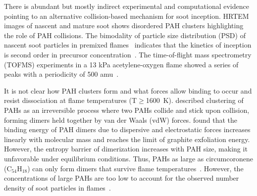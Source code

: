 
There is abundant but mostly indirect experimental and computational evidence pointing to an alternative collision-based mechanism for soot inception. HRTEM images of nascent and mature soot shows disordered PAH clusters highlighting the role of PAH collisions. The bimodality of particle size distribution (PSD) of nascent soot particles in premixed flames~\citep{zhao2003measurement} indicates that the kinetics of inception is second order in precursor concentration~\citep{abid2009quantitative}. The time-of-flight mass spectrometry (TOFMS) experiments in a 13 kPa acetylene-oxygen flame showed a series of peaks with a periodicity of 500 amu~\citep{happold2009soot}. 

It is not clear how PAH clusters form and what forces allow binding to occur and resist dissociation at flame temperatures (T$\ge$1600~K). \citet{frenklach2002reaction} described clustering of PAHs as an irreversible process where two PAHs collide and stick upon collision, forming dimers held together by van der Waals (vdW) forces. \citet{herdman2008intermolecular} found that the binding energy of PAH dimers due to dispersive and electrostatic forces increases linearly with molecular mass and reaches the limit of graphite exfoliation energy. However, the entropy barrier of dimerization increases with PAH size, making it unfavorable under equilibrium conditions. Thus, PAHs as large as circumcoronene (C$_{54}$H$_{18}$) can only form dimers that survive flame temperatures~\citep{Wang2011}. However, the concentrations of large PAHs are too low to account for the observed number density of soot particles in flames~\citep{totton2012quantitative}.

